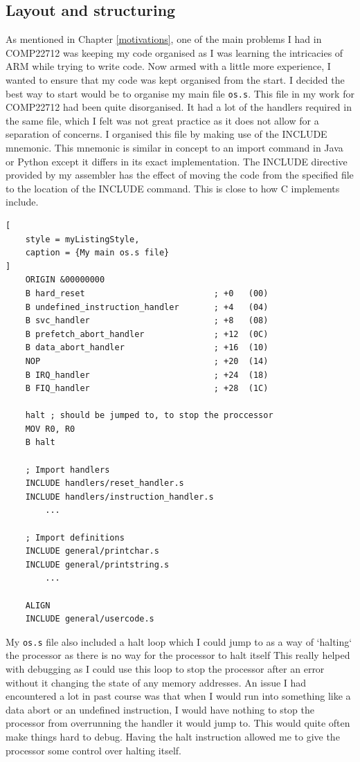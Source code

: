 \subsection{Layout and structuring}
As mentioned in Chapter \ref{motivations}, one of the main problems I had in COMP22712 was keeping my code organised as I was learning the intricacies of ARM while trying to write code. Now armed with a little more experience, I wanted to ensure that my code was kept organised from the start. I decided the best way to start would be to organise my main file \verb|os.s|. This file in my work for COMP22712 had been quite disorganised. It had a lot of the handlers required in the same file, which I felt was not great practice as it does not allow for a separation of concerns. I organised this file by making use of the INCLUDE mnemonic. This mnemonic is similar in concept to an import command in Java or Python except it differs in its exact implementation. The INCLUDE directive provided by my assembler has the effect of moving the code from the specified file to the location of the INCLUDE command. This is close to how C implements include. %

\begin{lstlisting}[
	style = myListingStyle,
	caption = {My main os.s file}
]
	ORIGIN &00000000
	B hard_reset                          ; +0   (00)
	B undefined_instruction_handler       ; +4   (04)
	B svc_handler                         ; +8   (08)
	B prefetch_abort_handler              ; +12  (0C)
	B data_abort_handler                  ; +16  (10)
	NOP                                   ; +20  (14)
	B IRQ_handler                         ; +24  (18)
	B FIQ_handler                         ; +28  (1C)

	halt ; should be jumped to, to stop the proccessor
	MOV R0, R0
	B halt

	; Import handlers
	INCLUDE handlers/reset_handler.s
	INCLUDE handlers/instruction_handler.s
 		...

	; Import definitions
	INCLUDE general/printchar.s
	INCLUDE general/printstring.s
  		...

	ALIGN
	INCLUDE general/usercode.s

\end{lstlisting}


My \verb|os.s| file also included a halt loop which I could jump to as a way of `halting` the processor as there is no way for the processor to halt itself
This really helped with debugging as I could use this loop to stop the processor after an error without it changing the state of any memory addresses. An issue I had encountered a lot in past course was that when I would run into something like a data abort or an undefined instruction, I would have nothing to stop the processor from overrunning the handler it would jump to. This would quite often make things hard to debug. Having the halt instruction allowed me to give the processor some control over halting itself.
